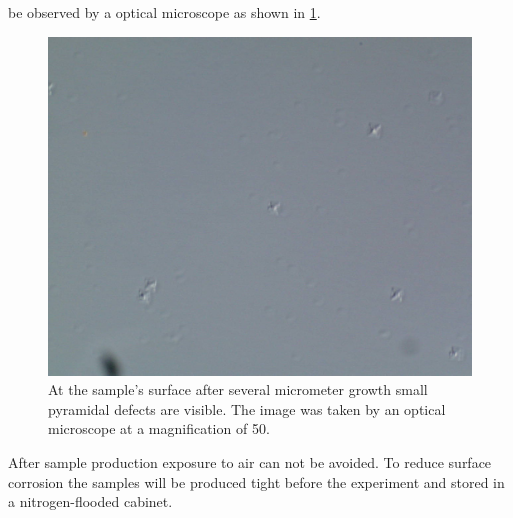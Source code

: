 be observed by a optical microscope as shown in \cref{pyramidaldefects}.\\
\begin{figure}
  \includegraphics[width=\linewidth]{Bilder/A2749_50_1.jpg}
  \caption{At the sample's surface after several micrometer growth small 
  pyramidal defects are visible. The image was taken by an optical microscope at 
  a magnification of 50.}
  \label{pyramidaldefects}
\end{figure}
After sample production exposure to air can not be avoided. To reduce surface 
corrosion the samples will be produced tight before the experiment and stored in 
a nitrogen-flooded cabinet.



%
%	
%

